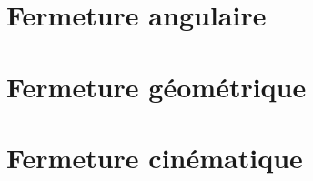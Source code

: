 \section{Fermeture angulaire}
\section{Fermeture géométrique}
\section{Fermeture cinématique}


%
%
%
